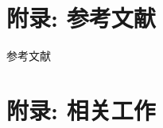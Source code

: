 \appendix

\section{附录: 参考文献}

\begin{frame}[t, allowframebreaks]{参考文献}
  \printbibliography
\end{frame}
\section{附录: 相关工作}
\hypertarget{appendix}{}


